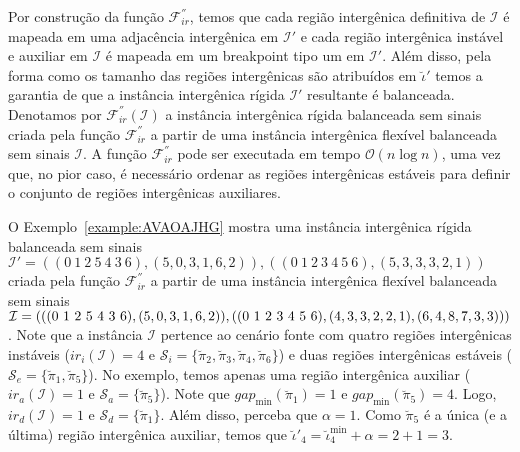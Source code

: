 Por construção da função $\mathcal{F}_{ir}^{''}$, temos que cada região intergênica definitiva de $\mathcal{I}$ é mapeada em uma adjacência intergênica em $\mathcal{I}'$ e cada região intergênica instável e auxiliar em $\mathcal{I}$ é mapeada em um breakpoint tipo um em $\mathcal{I}'$. Além disso, pela forma como os tamanho das regiões intergênicas são atribuídos em $\breve\iota'$ temos a garantia de que a instância intergênica rígida $\mathcal{I}'$ resultante é balanceada. Denotamos por $\mathcal{F}_{ir}^{''}(\mathcal{I})$ a instância intergênica rígida balanceada sem sinais criada pela função $\mathcal{F}_{ir}^{''}$ a partir de uma instância intergênica flexível balanceada sem sinais $\mathcal{I}$. A função $\mathcal{F}_{ir}^{''}$ pode ser executada em tempo $\mathcal{O}(n\log n)$, uma vez que, no pior caso, é necessário ordenar as regiões intergênicas estáveis para definir o conjunto de regiões intergênicas auxiliares. 

O Exemplo~\ref{example:AVAOAJHG} mostra uma instância intergênica rígida balanceada sem sinais $\mathcal{I}' = ((0~1~2~5~4~3~6),(5,0,3,1,6,2)),((0~1~2~3~4~5~6),(5,3,3,3,2,1))$ criada pela função $\mathcal{F}_{ir}^{''}$ a partir de uma instância intergênica flexível balanceada sem sinais $\mathcal{I} = (((0~1~2~5~4~3~6),(5,0,3,\break1,6,2)),((0~1~2~3~4~5~6),(4,3,3,2,2,1),(6,4,8,7,3,3)))$. Note que a instância $\mathcal{I}$ pertence ao cenário fonte com quatro regiões intergênicas instáveis ($ir_i(\mathcal{I}) = 4$ e $\mathcal{S}_{i}=\{\breve\pi_2,\breve\pi_3,\breve\pi_4,\breve\pi_6\}$) e duas regiões intergênicas estáveis ($\mathcal{S}_{e}=\{\breve\pi_1,\breve\pi_5\}$). No exemplo, temos apenas uma região intergênica auxiliar ($ir_a(\mathcal{I}) = 1$ e $\mathcal{S}_{a}=\{\breve\pi_5\}$). Note que $gap_{\min}(\breve\pi_1) = 1$ e $gap_{\min}(\breve\pi_5) = 4$. Logo, $ir_d(\mathcal{I}) = 1$ e $\mathcal{S}_{d}=\{\breve\pi_1\}$. Além disso, perceba que $\alpha = 1$. Como $\breve\pi_5$ é a única (e a última) região intergênica auxiliar, temos que $\breve\iota'_4 = \breve\iota^{\min}_4 +\alpha = 2 + 1 = 3$.



